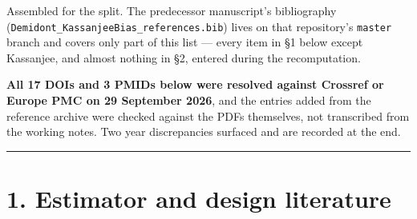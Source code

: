 Assembled for the split. The predecessor manuscript's bibliography
(\texttt{Demidont\_KassanjeeBias\_references.bib}) lives on that repository's \texttt{master}
branch and covers only part of this list --- every item in §1 below except
Kassanjee, and almost nothing in §2, entered during the recomputation.

\textbf{All 17 DOIs and 3 PMIDs below were resolved against Crossref or Europe PMC on
29 September 2026}, and the entries added from the reference archive were checked
against the PDFs themselves, not transcribed from the working notes. Two year
discrepancies surfaced and are recorded at the end.

\begin{center}\rule{0.5\linewidth}{0.5pt}\end{center}

\section{1. Estimator and design literature}

